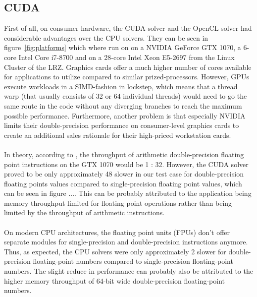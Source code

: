 \documentclass{article}%
\begin{document}
\subsection{CUDA}
First of all, on consumer hardware, the CUDA solver and the OpenCL solver had considerable advantages over the CPU solvers. They can be seen in figure~\ref{fig:platforms} which where run on on a NVIDIA GeForce GTX 1070, a 6-core Intel Core i7-8700 and on a 28-core Intel Xeon E5-2697 from the Linux Cluster of the LRZ. Graphics cards offer a much higher number of cores available for applications to utilize compared to similar prized-processors. However, GPUs execute workloads in a SIMD-fashion in lockstep, which means that a thread warp (that usually consists of 32 or 64 individual threads) would need to go the same route in the code without any diverging branches to reach the maximum possible performance. Furthermore, another problem is that especially NVIDIA limits their double-precision performance on consumer-level graphics cards to create an additional sales rationale for their high-priced workstation cards.\\
\\
In theory, according to \cite{cuda-guide}, the throughput of arithmetic double-precision floating point instructions on the GTX 1070 would be 1 : 32. However, the CUDA solver proved to be only approximately 48\text{\%} slower in our test case for double-precision floating points values compared to single-precision floating point values, which can be seen in figure .... This can be probably attributed to the application being memory throughput limited for floating point operations rather than being limited by the throughput of arithmetic instructions.\\
\\
On modern CPU architectures, the floating point units (FPUs) don’t offer separate modules for single-precision and double-precision instructions anymore. Thus, as expected, the CPU solvers were only approximately 2\text{\%} slower for double-precision floating-point numbers compared to single-precision floating-point numbers. The slight reduce in performance can probably also be attributed to the higher memory throughput of 64-bit wide double-precision floating-point numbers.\\
\\
\end{document}
